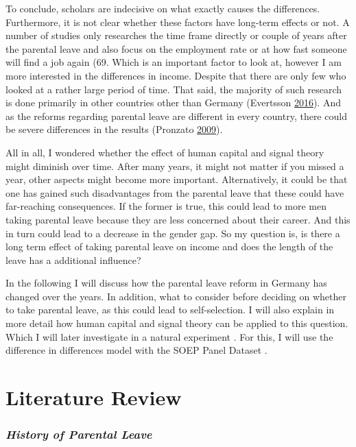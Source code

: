 \documentclass[
  12pt,
]{article}
\begin{document}
To conclude, scholars are indecisive on what exactly causes the differences. Furthermore, it is not clear whether these factors have long-term effects or not. A number of studies only researches the time frame directly or couple of years after the parental leave and also focus on the employment rate or at how fast someone will find a job again (69. Which is an important factor to look at, however I am more interested in the differences in income. Despite that there are only few who looked at a rather large period of time. That said, the majority of such research is done primarily in other countries other than Germany (Evertsson \protect\hyperlink{ref-evertsson_parental_2016}{2016}). And as the reforms regarding parental leave are different in every country, there could be severe differences in the results (Pronzato \protect\hyperlink{ref-pronzato_return_2009}{2009}).

All in all, I wondered whether the effect of human capital and signal theory might diminish over time. After many years, it might not matter if you missed a year, other aspects might become more important. Alternatively, it could be that one has gained such disadvantages from the parental leave that these could have far-reaching consequences. If the former is true, this could lead to more men taking parental leave because they are less concerned about their career. And this in turn could lead to a decrease in the gender gap.
So my question is, is there a long term effect of taking parental leave on income and does the length of the leave has a additional influence?

In the following I will discuss how the parental leave reform in Germany has changed over the years. In addition, what to consider before deciding on whether to take parental leave, as this could lead to self-selection. I will also explain in more detail how human capital and signal theory can be applied to this question. Which I will later investigate in a natural experiment . For this, I will use the difference in differences model with the SOEP Panel Dataset .

\hypertarget{literature-review}{%
\section{Literature Review}\label{literature-review}}

\hypertarget{history-of-parental-leave}{%
\subsubsection*{\texorpdfstring{\emph{History of Parental Leave}}{History of Parental Leave}}\label{history-of-parental-leave}}
\end{document}
